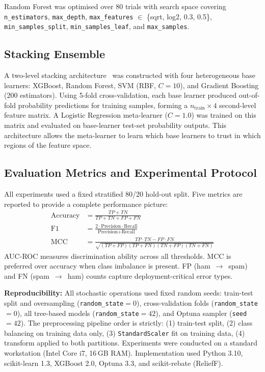 \documentclass[conference]{IEEEtran}
\begin{document}
Random Forest was optimised over 80 trials with search space covering \texttt{n\_estimators}, \texttt{max\_depth}, \texttt{max\_features} $\in$ \{sqrt, log2, 0.3, 0.5\}, \texttt{min\_samples\_split}, \texttt{min\_samples\_leaf}, and \texttt{max\_samples}.

\subsection{Stacking Ensemble}

A two-level stacking architecture~\cite{ref12} was constructed with four heterogeneous base learners: XGBoost, Random Forest, SVM (RBF, $C=10$), and Gradient Boosting (200 estimators). Using 5-fold cross-validation, each base learner produced out-of-fold probability predictions for training samples, forming a $n_\text{train} \times 4$ second-level feature matrix. A Logistic Regression meta-learner ($C=1.0$) was trained on this matrix and evaluated on base-learner test-set probability outputs. This architecture allows the meta-learner to learn which base learners to trust in which regions of the feature space.

\subsection{Evaluation Metrics and Experimental Protocol}

All experiments used a fixed stratified 80/20 hold-out split. Five metrics are reported to provide a complete performance picture:
\begin{align}
\text{Accuracy} &= \frac{TP+TN}{TP+TN+FP+FN} \\
\text{F1} &= \frac{2 \cdot \text{Precision} \cdot \text{Recall}}{\text{Precision} + \text{Recall}} \\
\text{MCC} &= \frac{TP \cdot TN - FP \cdot FN}{\sqrt{(TP+FP)(TP+FN)(TN+FP)(TN+FN)}}
\end{align}
AUC-ROC measures discrimination ability across all thresholds. MCC is preferred over accuracy when class imbalance is present. FP (ham~$\to$~spam) and FN (spam~$\to$~ham) counts capture deployment-critical error types.

\textbf{Reproducibility:} All stochastic operations used fixed random seeds: train-test split and oversampling (\texttt{random\_state}$=0$), cross-validation folds (\texttt{random\_state}$=0$), all tree-based models (\texttt{random\_state}$=42$), and Optuna sampler (\texttt{seed}$=42$). The preprocessing pipeline order is strictly: (1) train-test split, (2) class balancing on training data only, (3) \texttt{StandardScaler} fit on training data, (4) transform applied to both partitions. Experiments were conducted on a standard workstation (Intel Core i7, 16\,GB RAM). Implementation used Python 3.10, scikit-learn 1.3, XGBoost 2.0, Optuna 3.3, and scikit-rebate (ReliefF).
\end{document}
